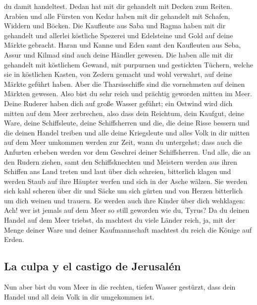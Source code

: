 du damit handeltest.  Dedan hat mit dir gehandelt mit
Decken zum Reiten.  Arabien und alle Fürsten von Kedar
haben mit dir gehandelt mit Schafen, Widdern und Böcken. 
Die Kaufleute aus Saba und Ragma haben mit dir gehandelt und allerlei
köstliche Spezerei und Edelsteine und Gold auf deine Märkte gebracht.
 Haran und Kanne und Eden samt den Kaufleuten aus Seba,
Assur und Kilmad sind auch deine Händler gewesen.  Die
haben alle mit dir gehandelt mit köstlichem Gewand, mit purpurnen und
gestickten Tüchern, welche sie in köstlichen Kasten, von Zedern gemacht
und wohl verwahrt, auf deine Märkte geführt haben.  Aber
die Tharsisschiffe sind die vornehmsten auf deinen Märkten gewesen. Also
bist du sehr reich und prächtig geworden mitten im Meer. 
Deine Ruderer haben dich auf große Wasser geführt; ein Ostwind wird dich
mitten auf dem Meer zerbrechen,  also dass dein Reichtum,
dein Kaufgut, deine Ware, deine Schiffsleute, deine Schiffsherren und
die, die deine Risse bessern und die deinen Handel treiben und alle
deine Kriegsleute und alles Volk in dir mitten auf dem Meer umkommen
werden zur Zeit, wann du untergehst;  dass auch die
Anfurten erbeben werden vor dem Geschrei deiner Schiffsherren.
 Und alle, die an den Rudern ziehen, samt den
Schiffsknechten und Meistern werden aus ihren Schiffen ans Land treten
 und laut über dich schreien, bitterlich klagen und
werden Staub auf ihre Häupter werfen und sich in der Asche wälzen.
 Sie werden sich kahl scheren über dir und Säcke um sich
gürten und von Herzen bitterlich um dich weinen und trauern.
 Es werden auch ihre Kinder über dich wehklagen: Ach! wer
ist jemals auf dem Meer so still geworden wie du, Tyrus? 
Da du deinen Handel auf dem Meer triebst, da machtest du viele Länder
reich, ja, mit der Menge deiner Ware und deiner Kaufmannschaft machtest
du reich die Könige auf Erden.

\hypertarget{la-culpa-y-el-castigo-de-jerusaluxe9n}{%
\subsection{La culpa y el castigo de
Jerusalén}\label{la-culpa-y-el-castigo-de-jerusaluxe9n}}

 Nun aber bist du vom Meer in die rechten, tiefen Wasser
gestürzt, dass dein Handel und all dein Volk in dir umgekommen ist.

